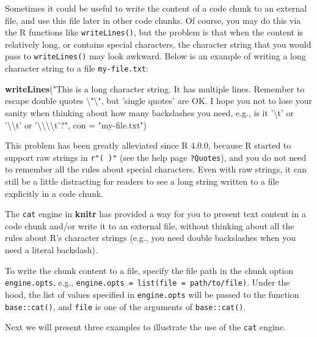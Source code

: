\documentclass[
  11pt,
]{krantz}
\newenvironment{Shaded}{\begin{snugshade}}{\end{snugshade}}
\newcommand{\CharTok}[1]{\textcolor[rgb]{0.5,0.5,0.5}{#1}}
\newcommand{\DataTypeTok}[1]{\textcolor[rgb]{0.27,0.27,0.27}{#1}}
\newcommand{\KeywordTok}[1]{\textcolor[rgb]{0.27,0.27,0.27}{\textbf{#1}}}
\newcommand{\NormalTok}[1]{#1}
\newcommand{\StringTok}[1]{\textcolor[rgb]{0.5,0.5,0.5}{#1}}
\begin{document}
Sometimes it could be useful to write the content of a code chunk to an external file, and use this file later in other code chunks. Of course, you may do this via the R functions like \texttt{writeLines()}, but the problem is that when the content is relatively long, or contains special characters, the character string that you would pass to \texttt{writeLines()} may look awkward. Below is an example of writing a long character string to a file \texttt{my-file.txt}:

\begin{Shaded}
\begin{Highlighting}[]
\KeywordTok{writeLines}\NormalTok{(}\StringTok{"This is a long character string.}
\StringTok{It has multiple lines. Remember to escape}
\StringTok{double quotes }\CharTok{\textbackslash{}"\textbackslash{}"}\StringTok{, but 'single quotes' are OK.}
\StringTok{I hope you not to lose your sanity when thinking}
\StringTok{about how many backslashes you need, e.g., is it}
\StringTok{'}\CharTok{\textbackslash{}t}\StringTok{' or '}\CharTok{\textbackslash{}\textbackslash{}}\StringTok{t' or '}\CharTok{\textbackslash{}\textbackslash{}\textbackslash{}\textbackslash{}}\StringTok{t'?"}\NormalTok{, }
  \DataTypeTok{con =} \StringTok{"my-file.txt"}\NormalTok{)}
\end{Highlighting}
\end{Shaded}

This problem has been greatly alleviated since R 4.0.0, because R started to support raw strings in \texttt{r"(\ )"} (see the help page \texttt{?Quotes}), and you do not need to remember all the rules about special characters. Even with raw strings, it can still be a little distracting for readers to see a long string written to a file explicitly in a code chunk.

The \texttt{cat} engine in \textbf{knitr} has provided a way for you to present text content in a code chunk and/or write it to an external file, without thinking about all the rules about R's character strings (e.g., you need double backslashes when you need a literal backslash).

To write the chunk content to a file, specify the file path in the chunk option \texttt{engine.opts}, e.g., \texttt{engine.opts\ =\ list(file\ =\ \textquotesingle{}path/to/file\textquotesingle{})}. Under the hood, the list of values specified in \texttt{engine.opts} will be passed to the function \texttt{base::cat()}, and \texttt{file} is one of the arguments of \texttt{base::cat()}.

Next we will present three examples to illustrate the use of the \texttt{cat} engine.
\end{document}
